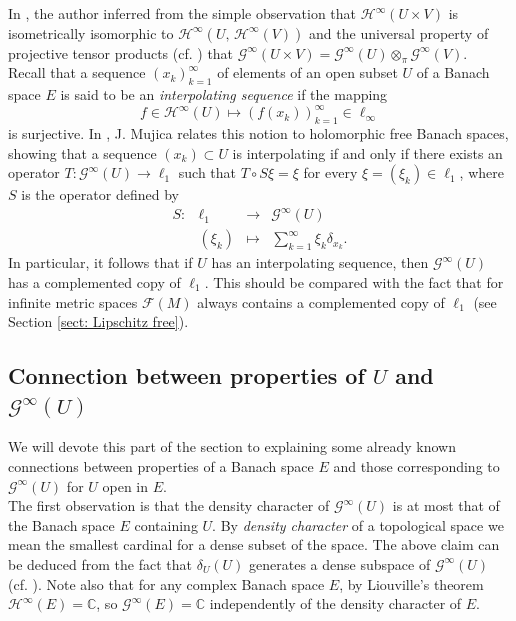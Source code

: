 \documentclass[12pt,leqno]{amsart}
\numberwithin{equation}{section} %
\theoremstyle{definition}
\numberwithin{equation}{section}
\begin{document}
In \cite[Theorem 6.1]{Mujica92}, the author inferred from the simple observation that $\mathcal{H}^\infty(U\times V)$ is isometrically isomorphic to $\mathcal{H}^\infty(U,\,\mathcal{H}^\infty(V))$ and the universal property of projective tensor products (cf. \cite[Proposition 16.13]{BanachSpaceTheory}) that  $\mathcal{G}^\infty(U\times V)=\mathcal{G}^\infty(U)\otimes_{\pi} \mathcal{G}^\infty(V)$. \\



Recall that a sequence $(x_k)_{k=1}^\infty$ of elements of an open subset $U$ of a Banach space $E$ is said to be an \textit{interpolating sequence} if the mapping $$f\in\mathcal{H}^\infty(U)\mapsto (f(x_k) )_{k=1}^\infty\in\ell_\infty$$ is surjective. In \cite[Theorem 5.2]{Mujica912}, J. Mujica relates this notion to holomorphic free Banach spaces, showing that a sequence $(x_k)\subset U$ is interpolating if and only if there exists an operator $T:\mathcal{G}^\infty(U)\to\ell_1$ such that $T\circ S\xi=\xi$ for every $\xi=(\xi_k)\in\ell_1$, where $S$ is the operator defined by
$$
\begin{array}{rclc}
     S:&\ell_1&\longrightarrow &\mathcal{G}^\infty(U) \\
      &(\xi_k)& \longmapsto &\sum_{k=1}^\infty \xi_k\delta_{x_k}.
\end{array}
$$
In particular, it follows that if $U$ has an interpolating sequence, then $\mathcal{G}^\infty(U)$ has a complemented copy of $\ell_1$. This should be compared with the fact that for infinite metric spaces $\mathcal F(M)$ always contains a complemented copy of $\ell_1$ (see Section \ref{sect: Lipschitz free}).

 
\subsection{Connection between properties of \texorpdfstring{$U$}{Lg} and \texorpdfstring{$\mathcal{G}^\infty(U)$}{Lg}}

We will devote this part of the section to explaining some already known connections between properties of a Banach space $E$ and those corresponding to $\mathcal{G}^\infty(U)$ for $U$ open in $E$.\\ 

The first observation is that the density character of $\mathcal{G}^\infty(U)$ is at most that of the Banach space $E$ containing $U$. By \textit{density character} of a topological space we mean the smallest cardinal for a dense subset of the space. The above claim can be deduced from the fact that $\delta_U(U)$ generates a dense subspace of $\mathcal{G}^\infty(U)$ (cf. \cite[Remark 2.2]{Mujica91}). Note also that for any complex Banach space $E$, by Liouville's theorem $\mathcal H^\infty(E)=\mathbb C$, so $\mathcal G^\infty(E)=\mathbb C$ independently of the density character of $E$.\\
\end{document}
